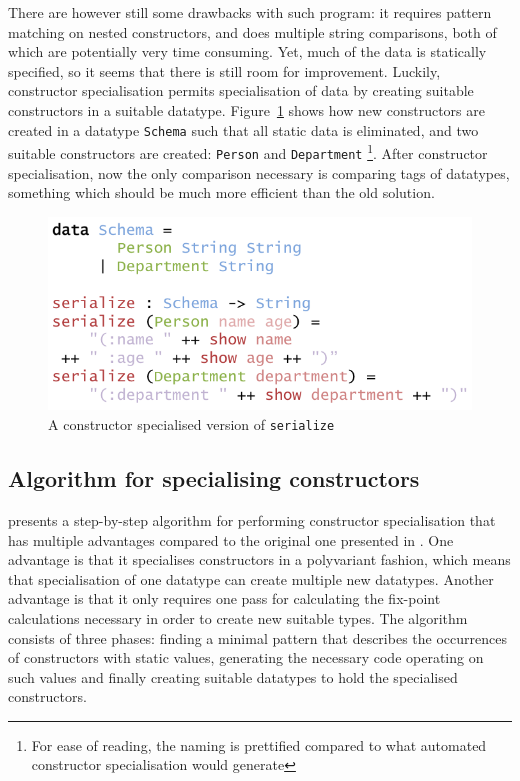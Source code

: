 \documentclass{ituthesis}
\newcommand{\ttconstructor}[1]{\textcolor{constructor-color}{\texttt{#1}}}
\newcommand{\tttype}[1]{\textcolor{type-color}{\texttt{#1}}}
\newcommand{\ttdec}[1]{\textcolor{declared-var-color}{\texttt{#1}}}
\theoremstyle{break}
\begin{document}
There are however still some drawbacks with such program: it requires pattern matching on nested constructors, and does multiple string comparisons, both of which are potentially very time consuming.
Yet, much of the data is statically specified, so it seems that there is still room for improvement.
Luckily, constructor specialisation permits specialisation of data by creating suitable constructors in a suitable datatype.
Figure~\ref{fig:conspecdata} shows how new constructors are created in a datatype \tttype{Schema} such that all static data is eliminated, and two suitable constructors are created: \ttconstructor{Person} and \ttconstructor{Department}
\footnote{For ease of reading, the naming is prettified compared to what automated constructor specialisation would generate}.
After constructor specialisation, now the only comparison necessary is comparing tags of datatypes, something which should be much more efficient than the old solution.

\begin{figure}[ht]
\begin{center}
    \includegraphics[scale=0.5]{Figures/ConstructorSpecialisationData.png}
\end{center}
\caption{A constructor specialised version of \ttdec{serialize}}
\label{fig:conspecdata}
\end{figure}

\subsection{Algorithm for specialising constructors}
\label{sub:Algorithm for specialising constructors}
\textcite{Dussart:1995:PCS:215465.215554} presents a step-by-step algorithm for performing constructor specialisation that has multiple advantages compared to the original one presented in \textcite{Mogensen:1993:CS:154630.154633}.
One advantage is that it specialises constructors in a polyvariant fashion, which means that specialisation of one datatype can create multiple new datatypes.
Another advantage is that it only requires one pass for calculating the fix-point calculations necessary in order to create new suitable types.
The algorithm consists of three phases: finding a minimal pattern that describes the occurrences of constructors with static values, generating the necessary code operating on such values
and finally creating suitable datatypes to hold the specialised constructors.
\end{document}
